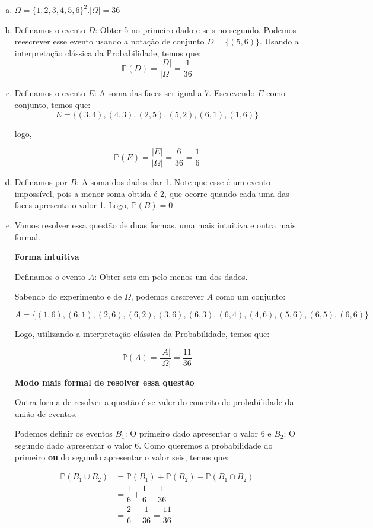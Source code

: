 \documentclass[12pt]{article}
\begin{document}
\begin{enumerate}[a)]
    \item $\Omega = \{1,2,3,4,5,6\}^2. |\Omega| = 36$
    \item Definamos o evento $D$: Obter 5 no primeiro dado e seis no segundo. Podemos reescrever esse evento usando a notação de conjunto $D=\{(5,6)\}$. Usando a interpretação clássica da Probabilidade, temos que:
    $$\mathds{P}(D) = \dfrac{|D|}{|\Omega|} = \dfrac{1}{36}$$
    \item Definamos o evento $E$: A soma das faces ser igual a 7. Escrevendo $E$ como conjunto, temos que:
    $$E = \{(3,4), (4,3), (2,5), (5,2), (6,1), (1,6)\}$$

    logo, 

    $$\mathds{P}(E) = \dfrac{|E|}{|\Omega|} = \dfrac{6}{36} = \dfrac{1}{6}$$
    \item Definamos por $B$: A soma dos dados dar 1. Note que esse é um evento impossível, pois a menor soma obtida é 2, que ocorre quando cada uma das faces apresenta o valor 1.
    Logo, $\mathds{P}(B) = 0$
    \item Vamos resolver essa questão de duas formas, uma mais intuitiva e outra mais formal. 
    
    \textbf{Forma intuitiva}

    Definamos o evento $A$: Obter seis em pelo menos um dos dados.

    Sabendo do experimento e de $\Omega$, podemos descrever $A$ como um conjunto:
    
    $$A = \{(1,6), (6,1), (2,6), (6,2), (3,6), (6,3), (6,4), (4,6), (5,6), (6,5), (6,6)\}$$

    Logo, utilizando a interpretação clássica da Probabilidade, temos que:

    $$\mathds{P}(A) = \dfrac{|A|}{|\Omega|} = \dfrac{11}{36}$$

    \textbf{Modo mais formal de resolver essa questão}

    Outra forma de resolver a questão é se valer do conceito de probabilidade da união de eventos.

    Podemos definir os eventos $B_1$: O primeiro dado apresentar o valor 6 e $B_2$: O segundo dado apresentar o valor 6.
    Como queremos a probabilidade do primeiro \textbf{ou} do segundo apresentar o valor seis, temos que:

    \begin{align*}
        \mathds{P}(B_1 \cup B_2) &= \mathds{P}(B_1)  + \mathds{P}(B_2) - \mathds{P}(B_1 \cap B_2)\\
        &= \dfrac{1}{6} + \dfrac{1}{6} - \dfrac{1}{36}\\
        &= \dfrac{2}{6} - \dfrac{1}{36} = \dfrac{11}{36}
    \end{align*}


\end{enumerate}
\end{document}
